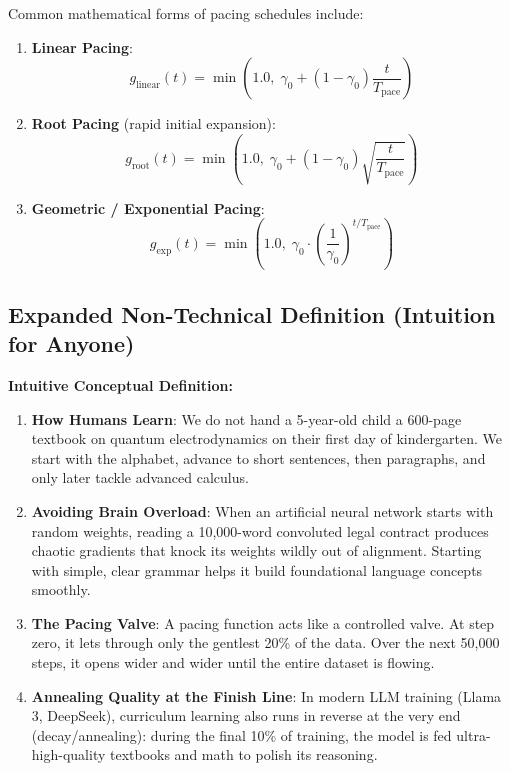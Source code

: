 \documentclass[11pt,a4paper]{article}
\theoremstyle{definition}
\begin{document}
Common mathematical forms of pacing schedules include:
\begin{enumerate}
    \item \textbf{Linear Pacing}:
    {\boldmath
    \begin{equation}
    g_{\text{linear}}(t) = \min\left(1.0, \; \gamma_0 + (1 - \gamma_0)\frac{t}{T_{\text{pace}}}\right)
    \end{equation}
    }
    \item \textbf{Root Pacing} (rapid initial expansion):
    {\boldmath
    \begin{equation}
    g_{\text{root}}(t) = \min\left(1.0, \; \gamma_0 + (1 - \gamma_0)\sqrt{\frac{t}{T_{\text{pace}}}}\right)
    \end{equation}
    }
    \item \textbf{Geometric / Exponential Pacing}:
    {\boldmath
    \begin{equation}
    g_{\text{exp}}(t) = \min\left(1.0, \; \gamma_0 \cdot \left(\frac{1}{\gamma_0}\right)^{t / T_{\text{pace}}}\right)
    \end{equation}
    }
\end{enumerate}

\subsection{Expanded Non-Technical Definition (Intuition for Anyone)}
\textbf{Intuitive Conceptual Definition:}
\begin{enumerate}
    \item \textbf{How Humans Learn}: We do not hand a 5-year-old child a 600-page textbook on quantum electrodynamics on their first day of kindergarten. We start with the alphabet, advance to short sentences, then paragraphs, and only later tackle advanced calculus.
    \item \textbf{Avoiding Brain Overload}: When an artificial neural network starts with random weights, reading a 10,000-word convoluted legal contract produces chaotic gradients that knock its weights wildly out of alignment. Starting with simple, clear grammar helps it build foundational language concepts smoothly.
    \item \textbf{The Pacing Valve}: A pacing function acts like a controlled valve. At step zero, it lets through only the gentlest 20\% of the data. Over the next 50,000 steps, it opens wider and wider until the entire dataset is flowing.
    \item \textbf{Annealing Quality at the Finish Line}: In modern LLM training (Llama 3, DeepSeek), curriculum learning also runs in reverse at the very end (decay/annealing): during the final 10\% of training, the model is fed ultra-high-quality textbooks and math to polish its reasoning.
\end{enumerate}
\end{document}
